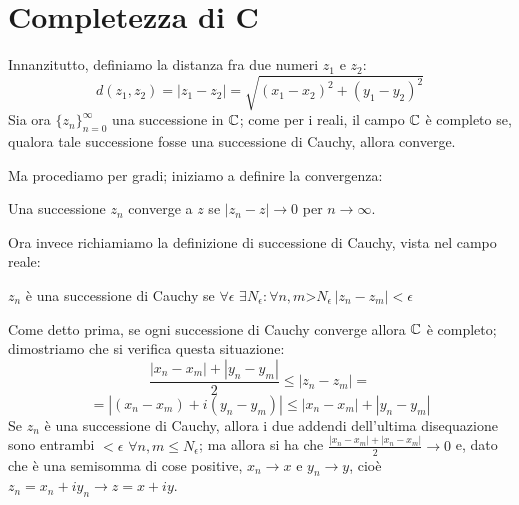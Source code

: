 \chapter{Completezza di C}

Innanzitutto, definiamo la distanza fra due numeri $z_1$ e $z_2$:
$$d(z_1,z_2)=|z_1-z_2|=\sqrt{(x_1-x_2)^2+(y_1-y_2)^2}$$
Sia ora $\{z_n\}_{n=0}^{\infty}$ una successione in $\mathbb{C}$; come per i reali, il campo $\mathbb{C}$ è completo se, qualora tale successione fosse una successione di Cauchy, allora converge.

Ma procediamo per gradi; iniziamo a definire la convergenza:

\begin{definizione}
 Una successione $z_n$ converge a $z$ se $|z_n-z|\to0$ per $n\to\infty$.
\end{definizione} Ora invece richiamiamo la definizione di successione di Cauchy, vista nel campo reale:
\begin{definizione}
$z_n$ è una successione di Cauchy se $\forall \epsilon$  $\exists N_{\epsilon} : \forall n,m$>$N_{\epsilon} \, |z_n-z_m| < \epsilon$
\end{definizione} Come detto prima, se ogni successione di Cauchy converge allora $\mathbb{C}$ è completo; dimostriamo che si verifica questa situazione:
$$\frac{|x_n-x_m|+|y_n-y_m|}{2}\leq |z_n-z_m|=$$
$$=|(x_n-x_m)+i(y_n-y_m)|\leq |x_n-x_m|+|y_n-y_m|$$
Se $z_n$ è una successione di Cauchy, allora i due addendi dell'ultima disequazione sono entrambi $<\epsilon$ $\forall n,m\leq N_{\epsilon}$; ma allora si ha che $\frac{|x_n-x_m|+|x_n-x_m|}{2} \to 0$ e, dato che è una semisomma di cose positive, $x_n\to x$ e $y_n\to y$, cioè $z_n=x_n+iy_n \to z=x+iy$.